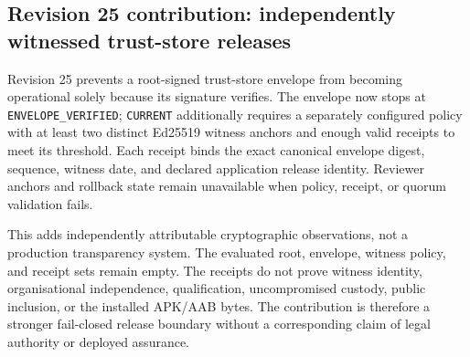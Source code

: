 

\subsection{Revision 25 contribution: independently witnessed trust-store releases}

Revision 25 prevents a root-signed trust-store envelope from becoming operational solely because its signature verifies. The envelope now stops at \texttt{ENVELOPE\_VERIFIED}; \texttt{CURRENT} additionally requires a separately configured policy with at least two distinct Ed25519 witness anchors and enough valid receipts to meet its threshold. Each receipt binds the exact canonical envelope digest, sequence, witness date, and declared application release identity. Reviewer anchors and rollback state remain unavailable when policy, receipt, or quorum validation fails.

This adds independently attributable cryptographic observations, not a production transparency system. The evaluated root, envelope, witness policy, and receipt sets remain empty. The receipts do not prove witness identity, organisational independence, qualification, uncompromised custody, public inclusion, or the installed APK/AAB bytes. The contribution is therefore a stronger fail-closed release boundary without a corresponding claim of legal authority or deployed assurance.
